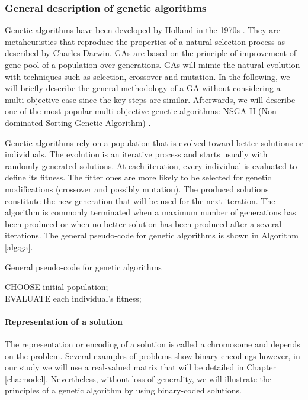 \subsubsection{General description of genetic algorithms}
Genetic algorithms have been developed by Holland in the 1970s \cite{holland1975adaptation}. They are metaheuristics that reproduce the properties of a natural selection process as described by Charles Darwin. GAs are based on the principle of improvement of gene pool of a population over generations. GAs will mimic the natural evolution with techniques such as selection, crossover and mutation. In the following, we will briefly describe the general methodology of a GA without considering a multi-objective case since the key steps are similar. Afterwards, we will describe one of the most popular multi-objective genetic algorithms: NSGA-II (Non-dominated Sorting Genetic Algorithm) \cite{Deb00afast}.

Genetic algorithms rely on a population that is evolved toward better solutions or individuals. The evolution is an iterative process and starts usually with randomly-generated solutions. At each iteration, every individual is evaluated to define its fitness. The fitter ones are more likely to be selected for genetic modifications (crossover and possibly mutation). The produced solutions constitute the new generation that will be used for the next iteration. The algorithm is commonly terminated when a maximum number of generations has been produced or when no better solution has been produced after a several iterations. The general pseudo-code for genetic algorithms is shown in Algorithm \ref{alg:ga}.

\begin{algorithm}[h!]
\caption{General pseudo-code for genetic algorithms}
\label{alg:ga}
CHOOSE initial population;\\
EVALUATE each individual's fitness;\\
\end{algorithm}

\paragraph{Representation of a solution}
The representation or encoding of a solution is called a chromosome and depends on the problem. Several examples of problems show binary encodings however, in our study we will use a real-valued matrix that will be detailed in Chapter \ref{cha:model}. Nevertheless, without loss of generality, we will illustrate the principles of a genetic algorithm by using binary-coded solutions.

